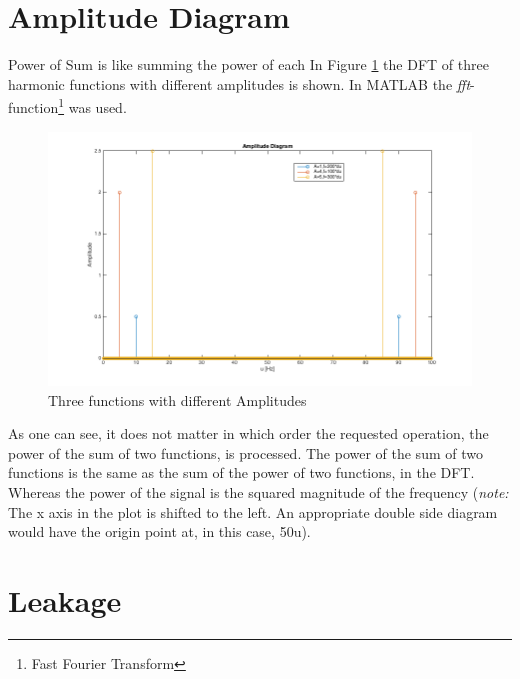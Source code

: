 \documentclass[12pt]{article}
\begin{document}
\section{Amplitude Diagram}
Power of Sum is like summing the power of each
In Figure \ref{fig:amplitude} the DFT of three harmonic functions with different amplitudes is shown. In MATLAB the \textit{fft}-function\footnote{Fast Fourier Transform} was used.
\begin{figure}[h!]
	\centering
	\includegraphics[width=\linewidth]{images/ass1_4}	
	\caption{Three functions with different Amplitudes}
	\label{fig:amplitude}
\end{figure}

As one can see, it does not matter in which order the requested operation, the power of the sum of two functions, is processed. The power of the sum of two functions is the same as the sum of the power of two functions, in the DFT.
Whereas the power of the signal is the squared magnitude of the frequency (\textit{note:} The x axis in the plot is shifted to the left. An appropriate double side diagram would have the origin point at, in this case, 50u).


\section{Leakage}

%
\end{document}
